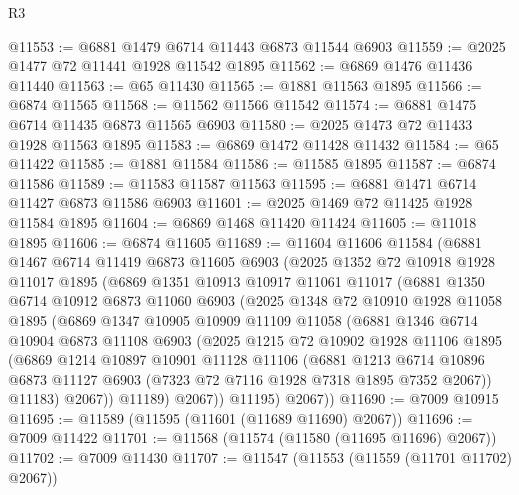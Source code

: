 \begin{lexlean}{R3}
\begin{coremodule}
@11553 := @6881 @1479 @6714 @11443 @6873 @11544 @6903
@11559 := @2025 @1477 @72 @11441 @1928 @11542 @1895
@11562 := @6869 @1476 @11436 @11440
@11563 := @65 @11430
@11565 := @1881 @11563 @1895
@11566 := @6874 @11565
@11568 := @11562 @11566 @11542
@11574 := @6881 @1475 @6714 @11435 @6873 @11565 @6903
@11580 := @2025 @1473 @72 @11433 @1928 @11563 @1895
@11583 := @6869 @1472 @11428 @11432
@11584 := @65 @11422
@11585 := @1881 @11584
@11586 := @11585 @1895
@11587 := @6874 @11586
@11589 := @11583 @11587 @11563
@11595 := @6881 @1471 @6714 @11427 @6873 @11586 @6903
@11601 := @2025 @1469 @72 @11425 @1928 @11584 @1895
@11604 := @6869 @1468 @11420 @11424
@11605 := @11018 @1895
@11606 := @6874 @11605
@11689 := @11604
    @11606
    @11584
    (@6881
      @1467
      @6714
      @11419
      @6873
      @11605
      @6903
      (@2025
        @1352
        @72
        @10918
        @1928
        @11017
        @1895
        (@6869
          @1351
          @10913
          @10917
          @11061
          @11017
          (@6881
            @1350
            @6714
            @10912
            @6873
            @11060
            @6903
            (@2025
              @1348
              @72
              @10910
              @1928
              @11058
              @1895
              (@6869
                @1347
                @10905
                @10909
                @11109
                @11058
                (@6881
                  @1346
                  @6714
                  @10904
                  @6873
                  @11108
                  @6903
                  (@2025
                    @1215
                    @72
                    @10902
                    @1928
                    @11106
                    @1895
                    (@6869
                      @1214
                      @10897
                      @10901
                      @11128
                      @11106
                      (@6881
                        @1213
                        @6714
                        @10896
                        @6873
                        @11127
                        @6903
                        (@7323 @72 @7116 @1928 @7318 @1895 @7352 @2067))
                      @11183)
                    @2067))
                @11189)
              @2067))
          @11195)
        @2067))
@11690 := @7009 @10915
@11695 := @11589 (@11595 (@11601 (@11689 @11690) @2067))
@11696 := @7009 @11422
@11701 := @11568 (@11574 (@11580 (@11695 @11696) @2067))
@11702 := @7009 @11430
@11707 := @11547 (@11553 (@11559 (@11701 @11702) @2067))

\end{coremodule}
\end{lexlean}
